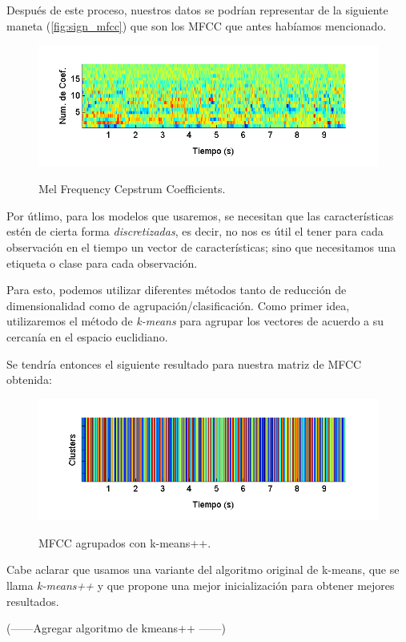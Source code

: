Después de este proceso, nuestros datos se podrían representar de la siguiente maneta (\autoref{fig:sign_mfcc}) que son los MFCC que antes habíamos mencionado.
\begin{figure}[bth]
  \myfloatalign
  {\includegraphics[width=0.9\linewidth]{gfx/chap5/signal-mfcc}} \quad
  \caption{Mel Frequency Cepstrum Coefficients.}
  \label{fig:sign_mfcc}
\end{figure}

Por útlimo, para los modelos que usaremos, se necesitan que las características estén de cierta forma \textit{discretizadas}, es decir, no nos es útil el tener para cada observación en el tiempo un vector de características; sino que necesitamos una etiqueta o clase para cada observación. 

Para esto, podemos utilizar diferentes métodos tanto de reducción de dimensionalidad como de agrupación/clasificación. Como primer idea, utilizaremos el método de \textit{k-means} para agrupar los vectores de acuerdo a su cercanía en el espacio euclidiano.

Se tendría entonces el siguiente resultado para nuestra matriz de MFCC obtenida:
\begin{figure}[bth]
  {\includegraphics[width=0.9\linewidth]{gfx/chap5/signal-clusters}} \quad
  \caption{MFCC agrupados con k-means++.}
  \label{fig:sign_clusters}
\end{figure}
Cabe aclarar que usamos una variante del algoritmo original de k-means, que se llama \textit{k-means++} y que propone una mejor inicialización para obtener mejores resultados.

(------Agregar algoritmo de kmeans++ ------)

